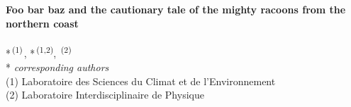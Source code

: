 {
  \raggedright
  \sffamily
  {\huge\bfseries
    Foo bar baz and the cautionary tale of the mighty racoons from the northern coast\\\mbox{}
  }\\
  \vspace{4mm}
  {\large
    \href{mailto:daeron@lsce.ipsl.fr}{\color{black}{M. Daëron}}*\textsuperscript{\,(1)\,{}}, \href{mailto:chaillot@lsce.ipsl.fr}{\color{black}{J. Chaillot}}*\textsuperscript{\,(1,2)}, \href{mailto:samir.kassi@univ-grenoble-alpes.fr}{\color{black}{S. Kassi}}\textsuperscript{\,(2)\,{}}
  }\\
  \vspace{8mm}
  {\small
    * {\itshape corresponding authors}\\
    (1) Laboratoire des Sciences du Climat et de l'Environnement\\
    (2) Laboratoire Interdisciplinaire de Physique\\
  }
}